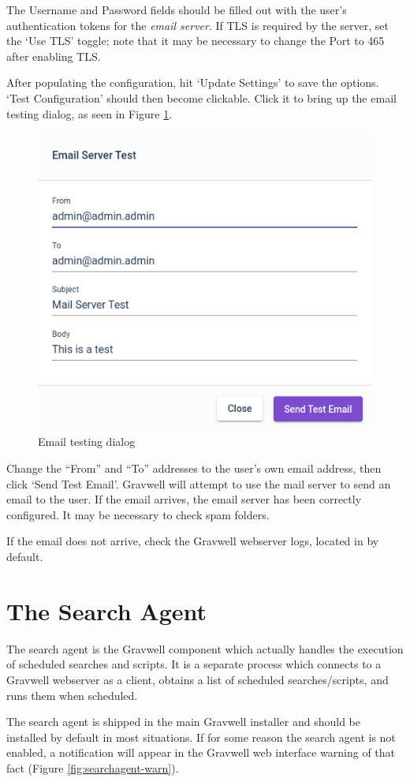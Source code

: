 The Username and Password fields should be filled out with the user's
authentication tokens for the \emph{email server}. If TLS is required by
the server, set the `Use TLS' toggle; note that it may be necessary to
change the Port to 465 after enabling TLS.

After populating the configuration, hit `Update Settings' to save the
options. `Test Configuration' should then become clickable. Click it to
bring up the email testing
dialog, as seen in Figure \ref{fig:email-testing}.

\begin{figure}
	\includegraphics[width=0.5\linewidth]{images/email-testing.png}
	\caption{Email testing dialog}
	\label{fig:email-testing}
\end{figure}

Change the ``From'' and ``To'' addresses to the user's own email
address, then click `Send Test Email'. Gravwell will attempt to use the
mail server to send an email to the user. If the email arrives, the
email server has been correctly configured. It may be necessary to check
spam folders.

If the email does not arrive, check the Gravwell webserver logs,
located in  by default.


\section{The Search Agent}
The search agent is the Gravwell component which actually handles the
execution of scheduled searches and scripts. It is a separate process
which connects to a Gravwell webserver as a client, obtains a list of
scheduled searches/scripts, and runs them when scheduled.

The search agent is shipped in the main Gravwell installer and should
be installed by default in most situations. If for some reason the
search agent is not enabled, a notification will appear in the Gravwell
web interface warning of that fact (Figure \ref{fig:searchagent-warn}).

